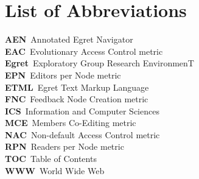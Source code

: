 
\tableofcontents
\newpage
\listoftables
\newpage
\listoffigures
\newpage
\chapter*{List of Abbreviations}
{\bf AEN}\dotfill\ Annotated Egret Navigator\\
{\bf EAC}\dotfill\ Evolutionary Access Control metric\\
{\bf Egret}\dotfill\ Exploratory Group Research EnvironmenT\\
{\bf EPN}\dotfill\ Editors per Node metric\\
{\bf ETML}\dotfill\ Egret Text Markup Language\\
{\bf FNC}\dotfill\ Feedback Node Creation metric\\
{\bf ICS}\dotfill\ Information and Computer Sciences\\
{\bf MCE}\dotfill\ Members Co-Editing metric\\
{\bf NAC}\dotfill\ Non-default Access Control metric\\
{\bf RPN}\dotfill\ Readers per Node metric\\
{\bf TOC}\dotfill\ Table of Contents\\
{\bf WWW}\dotfill\ World Wide Web\\

\newpage
